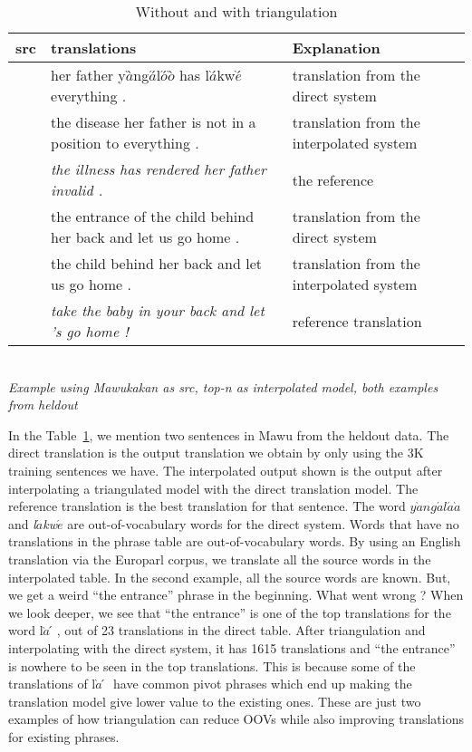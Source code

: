 \begin{table}
	\caption{Without and with triangulation}
	\footnotesize
	\small
	\begin{tabular}{p{}p{}p{}}
	\toprule
	src & translations & Explanation \\
	\toprule
	\multirow{3}{*}{\mawuexample} 
	& her father y$\grave{a}$̀ng$\acute{a}$́l$\acute{o}$́$\grave{o}$̀ has l$\grave{a}$́kw$\grave{e}$́ everything . & translation from the direct system 
	\\ \cmidrule(r){2-3}
	&  the disease her father is not in a position to everything . & translation from the interpolated system 
	\\ \cmidrule(r){2-3}
	&  \emph{the illness has rendered her father invalid .}  & the reference 
	\\  
	\midrule
	\midrule
	\multirow{3}{*}{\anothermawu} 
	&  the entrance of the child behind her back and let us go home . & translation from the direct system \\
	\cmidrule(r){2-3}
	&  the child behind her back and let us go home . & translation from the interpolated system \\
	\cmidrule(r){2-3}
	& \emph{take the baby in your back and let 's go home !} & reference translation \\
	\bottomrule
	\end{tabular}
	\\[3.5pt]
	{\centering \emph{Example using Mawukakan as src, top-\emph{n} as interpolated model, both examples from heldout}}
	\label{table:mawu_improvement}
\end{table}


In the Table~\ref{table:mawu_improvement}, we mention two sentences in Mawu from the heldout data. The direct translation is the output translation we obtain by only using the 3K training sentences we have. The interpolated output shown is the output after interpolating a triangulated model with the direct translation model. The reference translation is the best translation for that sentence. The word \emph{$y\grave{a}ng\acute{a}l\acute{a}\grave{a}$} and \emph{l$\acute{a}$kw$\acute{e}$} are out-of-vocabulary words for the direct system. Words that have no translations in the phrase table are out-of-vocabulary words. By using an English translation via the Europarl corpus, we translate all the source words in the interpolated table. In the second example, all the source words are known. But, we get a weird ``the entrance'' phrase in the beginning. What went wrong ? When we look deeper, we see that ``the entrance'' is one of the top translations for the word l$\grave{a}́$, out of 23 translations in the direct table. After triangulation and interpolating with the direct system, it has 1615 translations and ``the entrance'' is nowhere to be seen in the top translations. This is because some of the translations of l$\grave{a}́$ have common pivot phrases which end up making the translation model give lower value to the existing ones. These are just two examples of how triangulation can reduce OOVs while also improving translations for existing phrases. 


